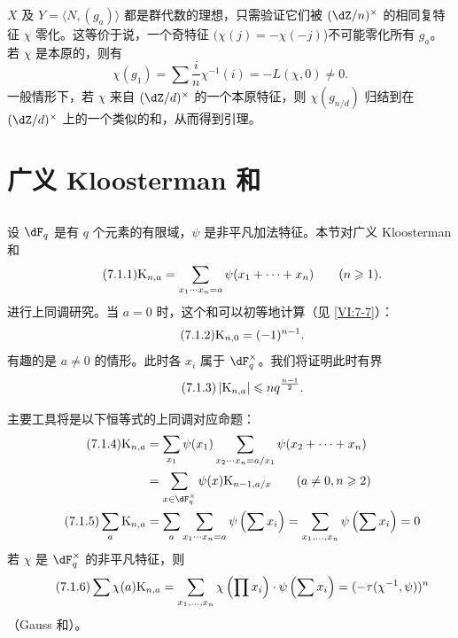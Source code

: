 $X$ 及 $Y=\langle N,(g_a)\rangle$ 都是群代数的理想，只需验证它们被 $(\dZ/n)^\times$ 的相同复特征 $\chi$ 零化。这等价于说，一个奇特征 $(\chi(j)=-\chi(-j)$)不可能零化所有 $g_a$。若 $\chi$ 是本原的，则有
\[
  \chi(g_1) = \sum \frac i n \chi^{-1}(i) = -L(\chi,0)\ne 0 \text{.}
\]
一般情形下，若 $\chi$ 来自 $(\dZ/d)^\times$ 的一个本原特征，则 $\chi(g_{n/d})$ 归结到在 $(\dZ/d)^\times$ 上的一个类似的和，从而得到引理。

\section{广义 Kloosterman 和}\label{VI:7}

\subsection{}\label{VI:7-1}

设 $\dF_q$ 是有 $q$ 个元素的有限域，$\psi$ 是非平凡加法特征。本节对广义 Kloosterman 和
\begin{equation*}\tag{7.1.1}\label{VI:eq:7-1-1}
  \textnormal{K}_{n,a} = \sum_{x_1\dotsm x_n = a} \psi(x_1+\cdots + x_n) \qquad (n\geqslant 1) \text{.}
\end{equation*}
进行上同调研究。当 $a=0$ 时，这个和可以初等地计算（见 \ref{VI:7-7}）：
\begin{equation*}\tag{7.1.2}\label{VI:eq:7-1-2}
  \textnormal{K}_{n,0} = (-1)^{n-1} \text{.}
\end{equation*}
有趣的是 $a\ne 0$ 的情形。此时各 $x_i$ 属于 $\dF_q^\times$。我们将证明此时有界
\begin{equation*}\tag{7.1.3}\label{VI:eq:7-1-3}
  \left|\textnormal{K}_{n,a}\right| \leqslant n q^{\frac{n-1}{2}} \text{.}
\end{equation*}

主要工具将是以下恒等式的上同调对应命题：
\begin{align*}\tag{7.1.4}\label{VI:eq:7-1-4}
  \kloos_{n,a} &= \sum_{x_1} \psi(x_1) \sum_{x_2\dotsm x_n = a/x_1} \psi(x_2+\cdots + x_n) \\ \notag
    &= \sum_{x\in \dF_q^\times} \psi(x) \kloos_{n-1,a/x} \qquad (a\ne 0,n\geqslant 2) \\ \tag{7.1.5}\label{VI:eq:7-1-5}
  \sum_a \kloos_{n,a} &= \sum_a \sum_{x_1 \dotsm x_n = a} \psi\left(\sum x_i\right) = \sum_{x_1,\dots,x_n} \psi\left(\sum x_i\right) = 0
\end{align*}
若 $\chi$ 是 $\dF_q^\times$ 的非平凡特征，则
\begin{equation*}\tag{7.1.6}\label{VI:eq:7-1-6}
  \sum \chi(a) \textnormal{K}_{n,a} = \sum_{x_1,\dots,x_n} \chi\left(\prod x_i\right) \cdot \psi\left(\sum x_i\right) = (-\tau(\chi^{-1},\psi))^n
\end{equation*}
（Gauss 和）。

